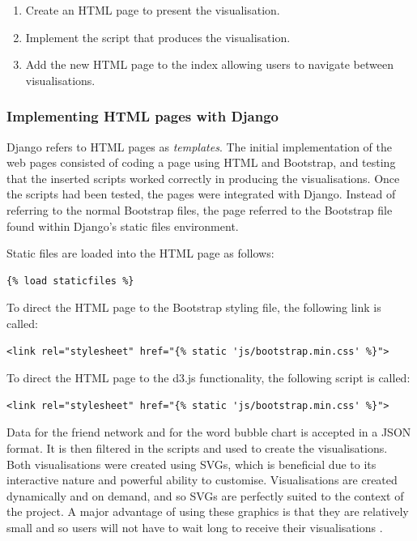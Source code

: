 \documentclass[12pt,onecolumn]{article}
\begin{document}
	\begin{enumerate}
		\item Create an HTML page to present the visualisation.
		\item Implement the script that produces the visualisation.
		\item Add the new HTML page to the index allowing users to navigate between visualisations.
	\end{enumerate}
	
	\subsubsection{Implementing HTML pages with Django}
	Django refers to HTML pages as \textit{templates}. The initial implementation of the web pages consisted of coding a page using HTML and Bootstrap, and testing that the inserted scripts worked correctly in producing the visualisations. Once the scripts had been tested, the pages were integrated with Django. Instead of referring to the normal Bootstrap files, the page referred to the Bootstrap file found within Django's static files environment.
	
	Static files are loaded into the HTML page as follows:
	\begin{lstlisting}
{% load staticfiles %}
	\end{lstlisting}
	
	To direct the HTML page to the Bootstrap styling file, the following link is called:
		\begin{lstlisting}
<link rel="stylesheet" href="{% static 'js/bootstrap.min.css' %}">
		\end{lstlisting}
	To direct the HTML page to the d3.js functionality, the following script is called:
		\begin{lstlisting}
<link rel="stylesheet" href="{% static 'js/bootstrap.min.css' %}">
		\end{lstlisting}
		
	Data for the friend network and for the word bubble chart is accepted in a JSON format. It is then filtered in the scripts and used to create the visualisations. Both visualisations were created using SVGs, which is beneficial due to its interactive nature and powerful ability to customise. Visualisations are created dynamically and on demand, and so SVGs are perfectly suited to the context of the project. A major advantage of using these graphics is that they are relatively small and so users will not have to wait long to receive their visualisations \cite{SVG}.
	
\end{document}
